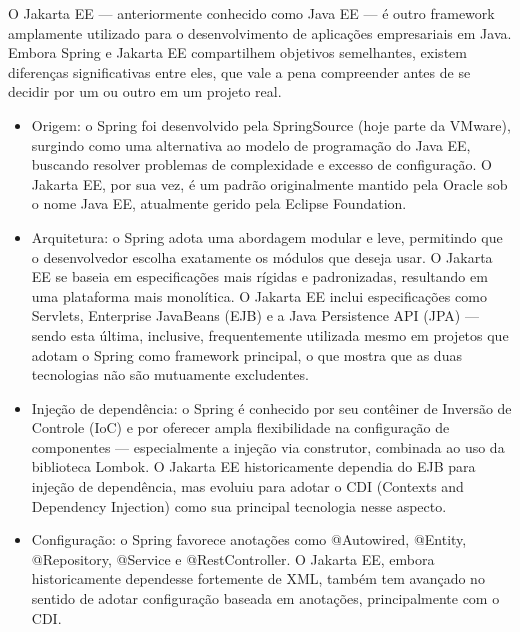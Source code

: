O Jakarta EE — anteriormente conhecido como Java EE — é outro framework amplamente utilizado para o desenvolvimento de aplicações empresariais em Java. Embora Spring e Jakarta EE compartilhem objetivos semelhantes, existem diferenças significativas entre eles, que vale a pena compreender antes de se decidir por um ou outro em um projeto real.

\begin{itemize}
  \item Origem: o Spring foi desenvolvido pela SpringSource (hoje parte da VMware), surgindo como uma alternativa ao modelo de programação do Java EE, buscando resolver problemas de complexidade e excesso de configuração. O Jakarta EE, por sua vez, é um padrão originalmente mantido pela Oracle sob o nome Java EE, atualmente gerido pela Eclipse Foundation.
\end{itemize}

\begin{itemize}
  \item Arquitetura: o Spring adota uma abordagem modular e leve, permitindo que o desenvolvedor escolha exatamente os módulos que deseja usar. O Jakarta EE se baseia em especificações mais rígidas e padronizadas, resultando em uma plataforma mais monolítica. O Jakarta EE inclui especificações como Servlets, Enterprise JavaBeans (EJB) e a Java Persistence API (JPA) — sendo esta última, inclusive, frequentemente utilizada mesmo em projetos que adotam o Spring como framework principal, o que mostra que as duas tecnologias não são mutuamente excludentes.
\end{itemize}

\begin{itemize}
  \item Injeção de dependência: o Spring é conhecido por seu contêiner de Inversão de Controle (IoC) e por oferecer ampla flexibilidade na configuração de componentes — especialmente a injeção via construtor, combinada ao uso da biblioteca Lombok. O Jakarta EE historicamente dependia do EJB para injeção de dependência, mas evoluiu para adotar o CDI (Contexts and Dependency Injection) como sua principal tecnologia nesse aspecto.
\end{itemize}

\begin{itemize}
  \item Configuração: o Spring favorece anotações como @Autowired, @Entity, @Repository, @Service e @RestController. O Jakarta EE, embora historicamente dependesse fortemente de XML, também tem avançado no sentido de adotar configuração baseada em anotações, principalmente com o CDI.
\end{itemize}

